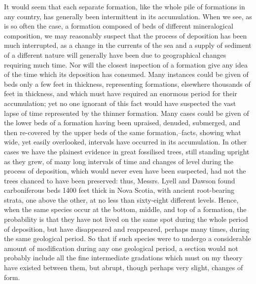 It would seem that each separate formation, like the whole pile of formations in any country, has generally been intermittent in its accumulation. When we see, as is so often the case, a formation composed of beds of different mineralogical composition, we may reasonably suspect that the process of deposition has been much interrupted, as a change in the currents of the sea and a supply of sediment of a different nature will generally have been due to geographical changes requiring much time. Nor will the closest inspection of a formation give any idea of the time which its deposition has consumed. Many instances could be given of beds only a few feet in thickness, representing formations, elsewhere thousands of feet in thickness, and which must have required an enormous period for their accumulation; yet no one ignorant of this fact would have suspected the vast lapse of time represented by the thinner formation. Many cases could be given of the lower beds of a formation having been upraised, denuded, submerged, and then re-covered by the upper beds of the same formation,--facts, showing what wide, yet easily overlooked, intervals have occurred in its accumulation. In other cases we have the plainest evidence in great fossilised trees, still standing upright as they grew, of many long intervals of time and changes of level during the process of deposition, which would never even have been suspected, had not the trees chanced to have been preserved: thus, Messrs. Lyell and Dawson found carboniferous beds 1400 feet thick in Nova Scotia, with ancient root-bearing strata, one above the other, at no less than sixty-eight different levels. Hence, when the same species occur at the bottom, middle, and top of a formation, the probability is that they have not lived on the same spot during the whole period of deposition, but have disappeared and reappeared, perhaps many times, during the same geological period. So that if such species were to undergo a considerable amount of modification during any one geological period, a section would not probably include all the fine intermediate gradations which must on my theory have existed between them, but abrupt, though perhaps very slight, changes of form.
